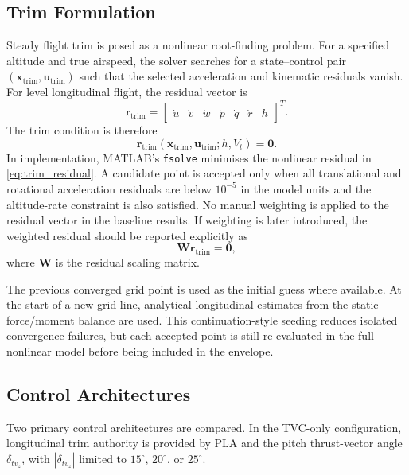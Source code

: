\documentclass[conf]{new-aiaa}
\newcommand{\trimres}{\mathbf{r}_{\mathrm{trim}}}
\newcommand{\xtrim}{\mathbf{x}_{\mathrm{trim}}}
\newcommand{\utrim}{\mathbf{u}_{\mathrm{trim}}}
\begin{document}
\subsection{Trim Formulation}
Steady flight trim is posed as a nonlinear root-finding problem. For a specified altitude and true airspeed, the solver searches for a state--control pair $(\xtrim,\utrim)$ such that the selected acceleration and kinematic residuals vanish. For level longitudinal flight, the residual vector is
\begin{equation}
\trimres =
\begin{bmatrix}
\dot{u} & \dot{v} & \dot{w} & \dot{p} & \dot{q} & \dot{r} & \dot{h}
\end{bmatrix}^{T}.
\label{eq:trim_residual}
\end{equation}
The trim condition is therefore
\begin{equation}
\trimres(\xtrim,\utrim;h,V_t)=\mathbf{0}.
\label{eq:trim_problem}
\end{equation}
In implementation, MATLAB's \texttt{fsolve} minimises the nonlinear residual in \eqref{eq:trim_residual}. A candidate point is accepted only when all translational and rotational acceleration residuals are below $10^{-5}$ in the model units and the altitude-rate constraint is also satisfied. No manual weighting is applied to the residual vector in the baseline results. If weighting is later introduced, the weighted residual should be reported explicitly as
\begin{equation}
\mathbf{W}\trimres=\mathbf{0},
\end{equation}
where $\mathbf{W}$ is the residual scaling matrix.

The previous converged grid point is used as the initial guess where available. At the start of a new grid line, analytical longitudinal estimates from the static force/moment balance are used. This continuation-style seeding reduces isolated convergence failures, but each accepted point is still re-evaluated in the full nonlinear model before being included in the envelope.

\subsection{Control Architectures}
Two primary control architectures are compared. In the TVC-only configuration, longitudinal trim authority is provided by PLA and the pitch thrust-vector angle $\delta_{tv_z}$, with $|\delta_{tv_z}|$ limited to $15^\circ$, $20^\circ$, or $25^\circ$.
\end{document}
